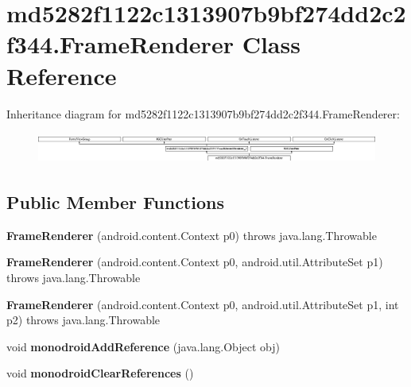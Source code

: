 \hypertarget{classmd5282f1122c1313907b9bf274dd2c2f344_1_1FrameRenderer}{}\section{md5282f1122c1313907b9bf274dd2c2f344.\+Frame\+Renderer Class Reference}
\label{classmd5282f1122c1313907b9bf274dd2c2f344_1_1FrameRenderer}
Inheritance diagram for md5282f1122c1313907b9bf274dd2c2f344.\+Frame\+Renderer\+:\begin{figure}[H]
\begin{center}
\leavevmode
\includegraphics[height=1.029412cm]{classmd5282f1122c1313907b9bf274dd2c2f344_1_1FrameRenderer}
\end{center}
\end{figure}
\subsection*{Public Member Functions}
\begin{DoxyCompactItemize}
\item 
\hypertarget{classmd5282f1122c1313907b9bf274dd2c2f344_1_1FrameRenderer_a4f499db463a1f9f643413f867e4eaae9}{}{\bfseries Frame\+Renderer} (android.\+content.\+Context p0)  throws java.\+lang.\+Throwable 	\label{classmd5282f1122c1313907b9bf274dd2c2f344_1_1FrameRenderer_a4f499db463a1f9f643413f867e4eaae9}

\item 
\hypertarget{classmd5282f1122c1313907b9bf274dd2c2f344_1_1FrameRenderer_a7ed34abb5b370697c5edb752a9dd72bb}{}{\bfseries Frame\+Renderer} (android.\+content.\+Context p0, android.\+util.\+Attribute\+Set p1)  throws java.\+lang.\+Throwable 	\label{classmd5282f1122c1313907b9bf274dd2c2f344_1_1FrameRenderer_a7ed34abb5b370697c5edb752a9dd72bb}

\item 
\hypertarget{classmd5282f1122c1313907b9bf274dd2c2f344_1_1FrameRenderer_a700ff2165c17c9ef68f1455a6cdaf7be}{}{\bfseries Frame\+Renderer} (android.\+content.\+Context p0, android.\+util.\+Attribute\+Set p1, int p2)  throws java.\+lang.\+Throwable 	\label{classmd5282f1122c1313907b9bf274dd2c2f344_1_1FrameRenderer_a700ff2165c17c9ef68f1455a6cdaf7be}

\item 
\hypertarget{classmd5282f1122c1313907b9bf274dd2c2f344_1_1FrameRenderer_a7a270cb715dc5ff2021697ef7acafd9f}{}void {\bfseries monodroid\+Add\+Reference} (java.\+lang.\+Object obj)\label{classmd5282f1122c1313907b9bf274dd2c2f344_1_1FrameRenderer_a7a270cb715dc5ff2021697ef7acafd9f}

\item 
\hypertarget{classmd5282f1122c1313907b9bf274dd2c2f344_1_1FrameRenderer_a9a58160f340283dcda5c447a2930652b}{}void {\bfseries monodroid\+Clear\+References} ()\label{classmd5282f1122c1313907b9bf274dd2c2f344_1_1FrameRenderer_a9a58160f340283dcda5c447a2930652b}

\end{DoxyCompactItemize}


